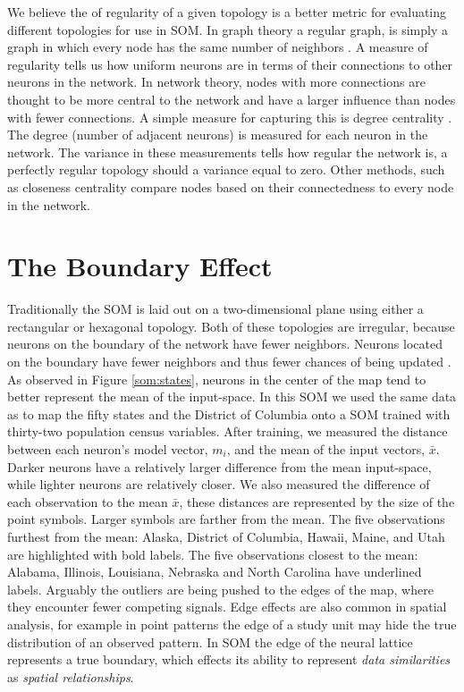 We believe the of regularity of a given topology is a better metric
for evaluating different topologies for use in SOM. In graph theory a regular
graph, is simply a graph in which every node has the same number of neighbors
\citep{harris2000}. A measure of regularity tells us how uniform neurons
are in terms of their connections to other neurons in the network. In network
theory, nodes with more connections are thought to be more central to the network and have a
larger influence than nodes with fewer connections. A simple measure for
capturing this is degree centrality \cite{Wasserman:1994}.  The degree (number
of adjacent neurons) is measured for each neuron in the network. The variance
in these measurements tells how regular the network is, a perfectly regular
topology should a variance equal to zero.  Other methods, such as closeness
centrality compare nodes based on their connectedness to every node in the
network.

\section{The Boundary Effect}
Traditionally the SOM is laid out on a two-dimensional plane using either a
rectangular or hexagonal topology.  Both of these topologies are irregular,
because neurons on the boundary of the network have fewer neighbors.  Neurons
located on the boundary have fewer neighbors and thus fewer chances of being
updated \citep{wu2006}.  As observed in Figure \ref{som:states}, neurons in
the center of the map tend to better represent the mean of the input-space.
In this SOM we used the same data as \cite{skupin08} to map the fifty states
and the District of Columbia onto a SOM trained with thirty-two population
census variables. After training, we measured the distance between each
neuron's model vector, $m_i$, and the mean of the input vectors, $\bar{x}$.
Darker neurons have a relatively larger difference from the mean input-space,
while lighter neurons are relatively closer. We also measured the difference
of each observation to the mean $\bar{x}$, these distances are represented by
the size of the point symbols.  Larger symbols are farther from the mean. The
five observations furthest from the mean: Alaska, District of Columbia,
Hawaii, Maine, and Utah are highlighted with bold labels.  The five
observations closest to the mean: Alabama, Illinois, Louisiana, Nebraska and
North Carolina have underlined labels.  Arguably the outliers are being pushed
to the edges of the map, where they encounter fewer competing signals.
Edge effects are also common in spatial analysis, for example in point
patterns the edge of a study unit may hide the true distribution of an
observed pattern.  In SOM the edge of the neural lattice represents a true
boundary, which effects its ability to represent \emph{data similarities} as
\emph{spatial relationships}.

